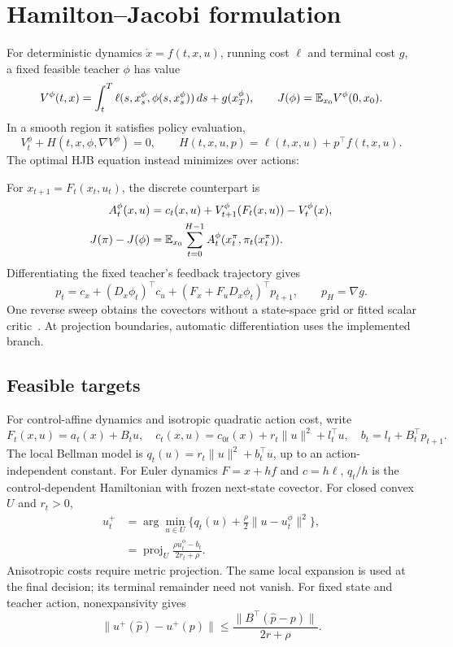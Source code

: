 \section{Hamilton--Jacobi formulation}
For deterministic dynamics $\dot x=f(t,x,u)$, running cost $\ell$ and
terminal cost $g$, a fixed feasible teacher $\phi$ has value
\begin{equation}
 V^\phi(t,x)=\int_t^T\ell(s,x_s^\phi,\phi(s,x_s^\phi))\,ds+g(x_T^\phi),
 \qquad J(\phi)=\mathbb E_{x_0}V^\phi(0,x_0).
\end{equation}
In a smooth region it satisfies policy evaluation,
\begin{equation}
 V_t^\phi+H(t,x,\phi,\nabla V^\phi)=0,
 \qquad H(t,x,u,p)=\ell(t,x,u)+p^\top f(t,x,u).
\end{equation}
The optimal HJB equation instead minimizes over actions:


For $x_{t+1}=F_t(x_t,u_t)$, the discrete counterpart is
\begin{align}
 A_t^\phi(x,u)&=c_t(x,u)+V_{t+1}^\phi(F_t(x,u))-V_t^\phi(x),\\
 J(\pi)-J(\phi)&=\mathbb E_{x_0}\sum_{t=0}^{H-1}
 A_t^\phi(x_t^\pi,\pi_t(x_t^\pi)).
\end{align}
Differentiating the fixed teacher's feedback trajectory gives
\begin{equation}
 p_t=c_x+(D_x\phi_t)^\top c_u+
       (F_x+F_uD_x\phi_t)^\top p_{t+1},\qquad p_H=\nabla g.
\end{equation}
One reverse sweep obtains the covectors without a state-space grid or
fitted scalar critic~\cite[Sec.~3, Eq.~(3)]{heess2015svg}. At projection
boundaries, automatic differentiation uses the implemented branch.

\subsection{Feasible targets}
For control-affine dynamics and isotropic quadratic action cost, write
\begin{equation}
 F_t(x,u)=a_t(x)+B_tu,\quad
 c_t(x,u)=c_{0t}(x)+r_t\|u\|^2+l_t^\top u,\quad
 b_t=l_t+B_t^\top p_{t+1}.
\end{equation}
The local Bellman model is $q_t(u)=r_t\|u\|^2+b_t^\top u$, up to
an action-independent constant. For Euler dynamics $F=x+hf$ and
$c=h\ell$, $q_t/h$ is the control-dependent Hamiltonian with frozen
next-state covector. For closed convex $U$ and $r_t>0$,
\begin{align}
 u_t^+&=\arg\min_{u\in U}\{q_t(u)+\tfrac\rho2\|u-u_t^\phi\|^2\},\\
 &=\operatorname{proj}_U\frac{\rho u_t^\phi-b_t}{2r_t+\rho}.
\end{align}
Anisotropic costs require metric projection. The same local expansion
is used at the final decision; its terminal remainder need not vanish.
For fixed state and teacher action, nonexpansivity gives
\begin{equation}
 \|u^+(\widehat p)-u^+(p)\|
 \leq\frac{\|B^\top(\widehat p-p)\|}{2r+\rho}.
\end{equation}


